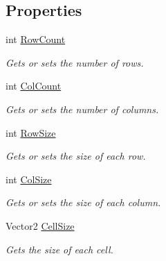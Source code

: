 \subsection*{Properties}
\begin{DoxyCompactItemize}
\item 
int \hyperlink{class_midnight_blue_1_1_engine_1_1_geometry_1_1_grid_af159c49f9f8b70fe5e7ed5779014654c}{Row\+Count}
\begin{DoxyCompactList}\small\item\em Gets or sets the number of rows. \end{DoxyCompactList}\item 
int \hyperlink{class_midnight_blue_1_1_engine_1_1_geometry_1_1_grid_acd4c2827f3d18e9f7ac6cb3883a72d58}{Col\+Count}
\begin{DoxyCompactList}\small\item\em Gets or sets the number of columns. \end{DoxyCompactList}\item 
int \hyperlink{class_midnight_blue_1_1_engine_1_1_geometry_1_1_grid_a99b20b74d0b2b60f3358aa6f3cdecc1d}{Row\+Size}
\begin{DoxyCompactList}\small\item\em Gets or sets the size of each row. \end{DoxyCompactList}\item 
int \hyperlink{class_midnight_blue_1_1_engine_1_1_geometry_1_1_grid_a95ba1e3a279e45901467c00563dedc07}{Col\+Size}
\begin{DoxyCompactList}\small\item\em Gets or sets the size of each column. \end{DoxyCompactList}\item 
Vector2 \hyperlink{class_midnight_blue_1_1_engine_1_1_geometry_1_1_grid_a0861ef4530fca1ab194c39aabc2a1676}{Cell\+Size}
\begin{DoxyCompactList}\small\item\em Gets the size of each cell. \end{DoxyCompactList}\end{DoxyCompactItemize}


